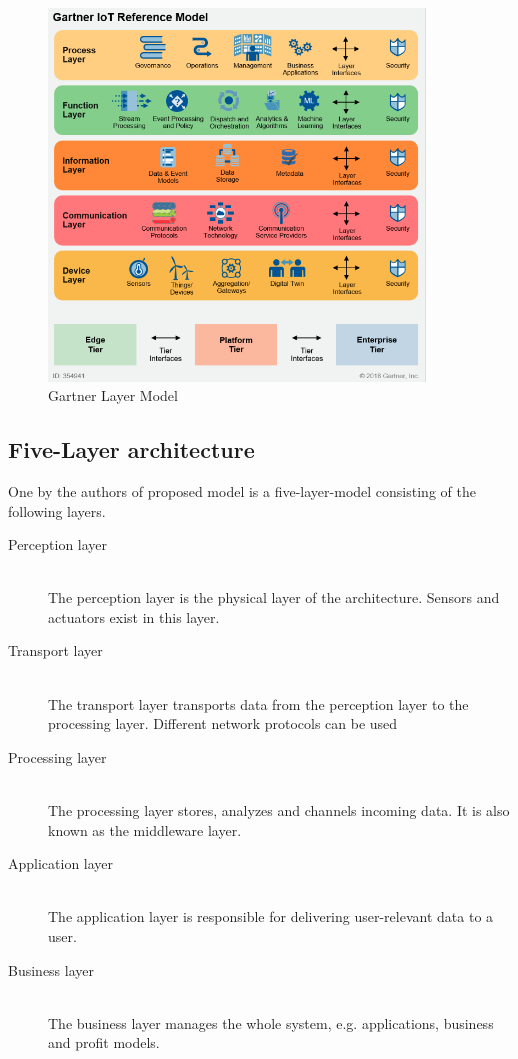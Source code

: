 \begin{figure}[th]
	\centering
	\includegraphics[width=100mm,scale=1]{Figures/gartnerIoT}
	\decoRule
	\caption[Gartner]{Gartner Layer Model}
	\label{fig:gartnerIoT}
\end{figure}



\subsection{Five-Layer architecture}
One by the authors of \parencite{fiveLayer1,fiveLayer} proposed model is a five-layer-model consisting of the following layers.
\begin{description}
    \item [Perception layer] \hfill \\
    The perception layer is the physical layer of the architecture. Sensors and actuators exist in this layer.
    \item [Transport layer] \hfill \\
     The transport layer transports data from the perception layer to the processing layer. Different network protocols can be used
   \item [Processing layer] \hfill \\
   The processing layer stores, analyzes and channels incoming data. It is also known as the middleware layer.
   \item [Application layer] \hfill \\
   The application layer is responsible for delivering user-relevant data to a user.
   \item [Business layer] \hfill \\
   The business layer manages the whole system, e.g. applications, business and profit models.
\end{description}


